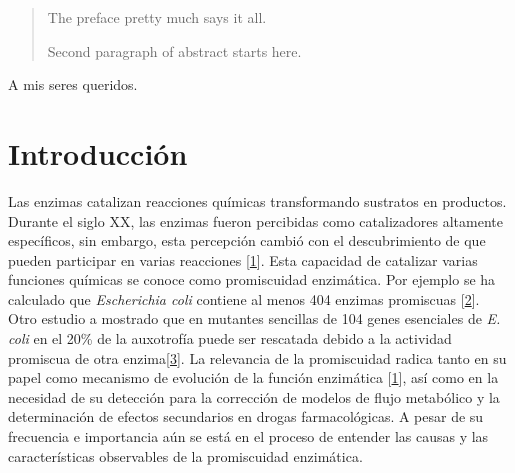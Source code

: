 \documentclass[12pt,twoside]{reedthesis}
\begin{document}
      \hypersetup{linkcolor=black}
    \setcounter{tocdepth}{3}
    \tableofcontents
  
      \listoftables
  
      \listoffigures
  
      \begin{abstract}
      The preface pretty much says it all. \par  Second paragraph of abstract
      starts here.
    \end{abstract}
  
      \begin{dedication}
      A mis seres queridos.
    \end{dedication}
  
  \mainmatter %
  \pagestyle{fancyplain} %

  \chapter*{Introducción}\label{introduccion}
  
  Las enzimas catalizan reacciones químicas transformando sustratos en
  productos. Durante el siglo XX, las enzimas fueron percibidas como
  catalizadores altamente específicos, sin embargo, esta percepción cambió
  con el descubrimiento de que pueden participar en varias reacciones
  {[}\protect\hyperlink{ref-jensen_enzyme_1976}{1}{]}. Esta capacidad de
  catalizar varias funciones químicas se conoce como promiscuidad
  enzimática. Por ejemplo se ha calculado que \emph{Escherichia coli}
  contiene al menos 404 enzimas promiscuas
  {[}\protect\hyperlink{ref-nam_network_2012}{2}{]}. Otro estudio a
  mostrado que en mutantes sencillas de 104 genes esenciales de \emph{E.
  coli} en el 20\% de la auxotrofía puede ser rescatada debido a la
  actividad promiscua de otra
  enzima{[}\protect\hyperlink{ref-patrick_multicopy_2007}{3}{]}. La
  relevancia de la promiscuidad radica tanto en su papel como mecanismo de
  evolución de la función enzimática
  {[}\protect\hyperlink{ref-jensen_enzyme_1976}{1}{]}, así como en la
  necesidad de su detección para la corrección de modelos de flujo
  metabólico y la determinación de efectos secundarios en drogas
  farmacológicas. A pesar de su frecuencia e importancia aún se está en el
  proceso de entender las causas y las características observables de la
  promiscuidad enzimática.
  
\end{document}
